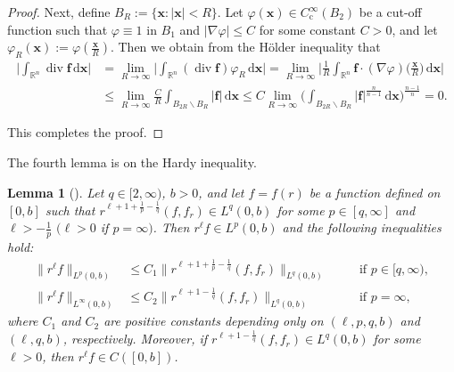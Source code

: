 \documentclass[11pt,reqno]{amsart}
\DeclareMathOperator{\diver}{\mathrm{div}}
\newtheorem{lem}{Lemma}[section]
\numberwithin{rk}{section}
\numberwithin{prop}{section}
\numberwithin{mydef}{section}
\numberwithin{lem}{section}
\numberwithin{equation}{section}
\numberwithin{thm}{section}
\begin{document}
\begin{proof}
Next, define $B_R:=\{\boldsymbol{x}:|\boldsymbol{x}|<R\}$. Let $\varphi(\boldsymbol{x})\in C^\infty_{\mathrm{c}}(B_2)$ be a cut-off function such that $\varphi\equiv 1$ in $B_1$ and $|\nabla \varphi|\leq C$ for some constant $C>0$, and let $\varphi_R(\boldsymbol{x}):=\varphi(\frac{\boldsymbol{x}}{R})$. Then we obtain from the H\"older inequality that
\begin{equation*}
\begin{aligned}
\Big|\int_{\mathbb{R}^n}\diver \boldsymbol{f}\,\mathrm{d}\boldsymbol{x}\Big|&=\lim_{R\to \infty} \Big|\int_{\mathbb{R}^n}(\diver \boldsymbol{f})\varphi_R\,\mathrm{d}\boldsymbol{x}\Big|=\lim_{R\to \infty}\Big|\frac{1}{R}\int_{\mathbb{R}^n}\boldsymbol{f}\cdot(\nabla\varphi)\big(\frac{\boldsymbol{x}}{R}\big)\,\mathrm{d}\boldsymbol{x}\Big|\\
&\leq \lim_{R\to \infty} \frac{C}{R}\int_{B_{2R}\backslash B_R}|\boldsymbol{f}|\,\mathrm{d}\boldsymbol{x}\leq C \lim_{R\to \infty} \Big(\int_{B_{2R}\backslash B_R}|\boldsymbol{f}|^\frac{n}{n-1}\,\mathrm{d}\boldsymbol{x}\Big)^\frac{n-1}{n}=0.
\end{aligned}
\end{equation*}

This completes the proof.
\end{proof}

The fourth lemma is on the Hardy inequality.
\begin{lem}[\cite{brown,CZZ1,opic}]\label{hardy}  
Let $q\in [2,\infty)$, $b>0$, and let $f=f(r)$ be a function defined on $[0,b]$ such that $r^{\ell +1+\frac{1}{p}-\frac{1}{q}}(f,f_r)\in L^q(0,b)$ for some $p\in [q,\infty]$ and $\ell>-\frac{1}{p}$ $(\ell>0$ if $p=\infty)$. Then $r^\ell f\in L^p(0,b)$ and the following inequalities hold{\rm :}
\begin{equation*}
\begin{aligned}
\|r^\ell f\|_{L^p(0,b)}&\leq C_1\big\|r^{\ell+1+\frac{1}{p}-\frac{1}{q}}(f,f_r)\big\|_{L^q(0,b)} &&\quad \text{if }p\in [q,\infty),\\
\|r^\ell f\|_{L^\infty(0,b)}&\leq C_2\big\|r^{\ell +1-\frac{1}{q}}(f,f_r)\big\|_{L^q(0,b)}  &&\quad \text{if }p=\infty,
\end{aligned}
\end{equation*}
where $C_1$ and $C_2$ are positive constants depending only on $(\ell,p,q,b)$ and  $(\ell,q,b)$, respectively. Moreover, if $r^{\ell +1-\frac{1}{q}}(f,f_r)\in L^q(0,b)$ for some $\ell>0$, then $r^\ell f\in C([0,b])$. 
\end{lem}
\end{document}
